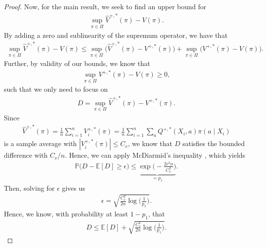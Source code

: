 \documentclass{article} %
\theoremstyle{plain}
\theoremstyle{definition}
\theoremstyle{remark}
\begin{document}
\begin{proof}
Now, for the main result, we seek to find an upper bound for
\begin{align}
    \sup_{\pi \in \Pi}  \hat{V}^{+,*}(\pi) - V(\pi) .
\end{align}
By adding a zero and sublinearity of the supremum operator, we have that 
\begin{align}
    \sup_{\pi \in \Pi}  \hat{V}^{+,*}(\pi) - V(\pi) 
    \leq \sup_{\pi \in \Pi} \Big(\hat{V}^{+,*}(\pi) - V^{+,*}(\pi) \Big) +\sup_{\pi \in \Pi} \Big( V^{+,*}(\pi) - V(\pi) \Big).
\end{align}
Further, by validity of our bounds, we know that
\begin{align}
    \sup_{\pi \in \Pi}  V^{+,*}(\pi) - V(\pi)  \geq 0,
\end{align}
such that we only need to focus on 
\begin{align}
    D = \sup_{\pi \in \Pi}  \hat{V}^{+,*}(\pi) - V^{+,*}(\pi) .
\end{align}
Since
\begin{align}
    \hat{V}^{+,*}(\pi) = \frac{1}{n}\sum_{i=1}^n V_i^{+,*}(\pi) = \frac{1}{n}\sum_{i=1}^n \sum_a Q^{+,*}(X_i, a) \pi(a\mid X_i)
\end{align}
is a sample average with $|V_i^{+,*}(\pi)|\leq C_v$, we know that $D$ satisfies the bounded difference with $C_v/n$. Hence, we can apply McDiarmid's inequality \citep{McDiarmid.1989}, which yields
\begin{align}
    \mathbb{P}\Big(D-\mathbb{E}[D] \geq \epsilon \Big) \leq \underbrace{\exp\Big(-\frac{2\epsilon^2 n}{C_v^2}\Big)}_{=p_1}.
\end{align}
Then, solving for $\epsilon$ gives us
\begin{align}
    \epsilon = \sqrt{\frac{C_v^2}{2n}\log \Big( \frac{1}{p_1}\Big)}.
\end{align}
Hence, we know, with probability at least $1-p_1$, that
\begin{align}
    D \leq \mathbb{E}[D] + \sqrt{\frac{C_v^2}{2n}\log \Big( \frac{1}{p_1}\Big)}.\label{eq:diarmid1}
\end{align}


\end{proof}
\end{document}
